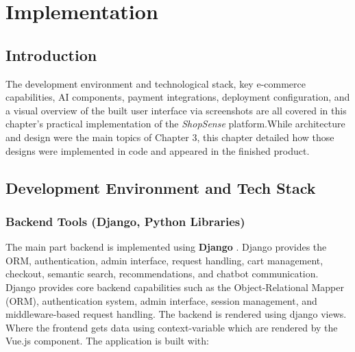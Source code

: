 \chapter{Implementation}
\section{Introduction}

The development environment and technological stack, key e-commerce capabilities, AI components, payment integrations, deployment configuration, and a visual overview of the built user interface via screenshots are all covered in this chapter's practical implementation of the \textit{ShopSense}  platform.While architecture and design were the main topics of Chapter 3, this chapter detailed how those designs were implemented in code and appeared in the finished product.



\section{Development Environment and Tech Stack}

\subsection{Backend Tools (Django, Python Libraries)}

The main part backend is implemented using \textbf{Django} . Django provides the ORM, authentication, admin interface, request handling, cart management, checkout, semantic search, recommendations, and chatbot communication.
Django provides core backend capabilities such as the Object-Relational Mapper (ORM), authentication system, admin interface, session management, and middleware-based request handling. The backend is rendered using django views. Where the frontend gets data using context-variable which are  rendered by the Vue.js component.
The application is built with:

